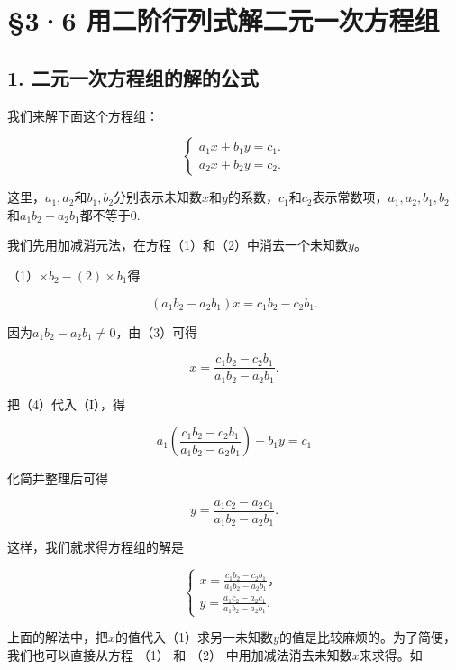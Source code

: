 \section{§3·6 用二阶行列式解二元一次方程组}

\subsection{1. 二元一次方程组的解的公式}

我们来解下面这个方程组：

\[
\left\{ \begin{array}{l} a _ {1} x + b _ {1} y = c _ {1}. \\ a _ {2} x + b _ {2} y = c _ {2}. \end{array} \right. \tag{1}
\]

这里，\(a_1, a_2\)和\(b_1, b_2\)分别表示未知数\(x\)和\(y\)的系数，\(c_1\)和\(c_2\)表示常数项，\(a_1, a_2, b_1, b_2\)和\(a_1 b_2 - a_2 b_1\)都不等于0.

我们先用加减消元法，在方程（1）和（2）中消去一个未知数\(y\)。

（1）\(\times b_{2} - (2) \times b_{1}\)得

\[
(a _ {1} b _ {2} - a _ {2} b _ {1}) x = c _ {1} b _ {2} - c _ {2} b _ {1}. \tag{3}
\]

因为\(a_{1}b_{2} - a_{2}b_{1}\neq 0\)，由（3）可得

\[
x = \frac{c _ {1} b _ {2} - c _ {2} b _ {1}}{a _ {1} b _ {2} - a _ {2} b _ {1}}. \tag{4}
\]

把（4）代入（I），得

\[
a _ {1} \left(\frac{c _ {1} b _ {2} - c _ {2} b _ {1}}{a _ {1} b _ {2} - a _ {2} b _ {1}}\right) + b _ {1} y = c _ {1}
\]

化简并整理后可得

\[
y = \frac{a _ {1} c _ {2} - a _ {2} c _ {1}}{a _ {1} b _ {2} - a _ {2} b _ {1}}. \tag{5}
\]

这样，我们就求得方程组的解是

\[
\left\{ \begin{array}{l} x = \frac{c _ {1} b _ {2} - c _ {2} b _ {1}}{a _ {1} b _ {2} - a _ {2} b _ {1}}\text{，} \\ y = \frac{a _ {1} c _ {2} - a _ {2} c _ {1}}{a _ {1} b _ {2} - a _ {2} b _ {1}}. \end{array} \right.
\]

上面的解法中，把\(x\)的值代入（1）求另一未知数\(y\)的值是比较麻烦的。为了简便，我们也可以直接从方程
（1） 和 （2） 中用加减法消去未知数\(x\)来求得。如

